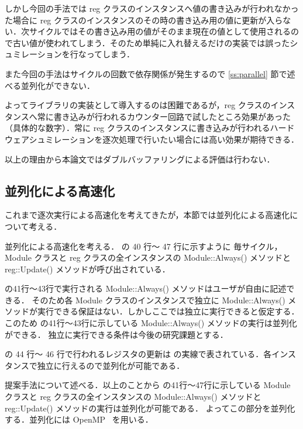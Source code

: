 しかし今回の手法では reg
クラスのインスタンスへ値の書き込みが行われなかった場合に reg
クラスのインスタンスのその時の書き込み用の値に更新が入らない．次サイクルではその書き込み用の値がそのまま現在の値として使用されるので古い値が使われてしまう．そのため単純に入れ替えるだけの実装では誤ったシュミレーションを行なってしまう．

また今回の手法はサイクルの回数で依存関係が発生するので \ref{ss:parallel}
節で述べる並列化ができない．

よってライブラリの実装として導入するのは困難であるが，reg
クラスのインスタンスへ常に書き込みが行われるカウンター回路で試したところ効果があった（具体的な数字）．常に
reg
クラスのインスタンスに書き込みが行われるハードウェアシュミレーションを逐次処理で行いたい場合には高い効果が期待できる．

以上の理由から本論文ではダブルバッファリングによる評価は行わない．

\fi

\subsection{並列化による高速化 \label{ss:parallel}}

これまで逐次実行による高速化を考えてきたが，本節では並列化による高速化について考える．

並列化による高速化を考える． の 40 行〜 47 行に示すように
毎サイクル，Module クラスと reg クラスの全インスタンスの Module::Always() メソッドと reg::Update() メソッドが呼び出されている．

 の41行〜43行で実行される Module::Always() メソッドはユーザが自由に記述できる．
そのため各 Module クラスのインスタンスで独立に Module::Always() メソッドが実行できる保証はない．しかしここでは独立に実行できると仮定する．
このため の41行〜43行に示している Module::Always() メソッドの実行は並列化ができる．
独立に実行できる条件は今後の研究課題とする．

 の 44 行〜 46 行で行われるレジスタの更新は の実線で表されている．各インスタンスで独立に行えるので並列化が可能である．

提案手法について述べる．以上のことから の41行〜47行に示している
Module クラスと reg クラスの全インスタンスの Module::Always() メソッドと reg::Update() メソッドの実行は並列化が可能である．
よってこの部分を並列化する．並列化には OpenMP~\cite{openmp} を用いる．

